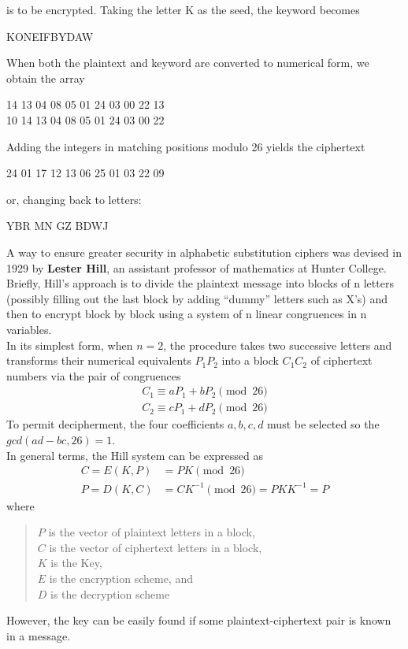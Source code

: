 \documentclass{article}
\begin{document}
is to be encrypted. Taking the letter K as the seed, the keyword becomes
\begin{center}
    KONEIFBYDAW
\end{center}
When both the plaintext and keyword are converted to numerical form, we obtain the array
\begin{center}
    14 13 04 08 05 01 24 03 00 22 13\\
    10 14 13 04 08 05 01 24 03 00 22
\end{center}
Adding the integers in matching positions modulo 26 yields the ciphertext
\begin{center}
    24 01 17 12 13 06 25 01 03 22 09
\end{center}
or, changing back to letters:
\begin{center}
    YBR MN GZ BDWJ
\end{center}

A way to ensure greater security in alphabetic substitution ciphers was devised in 1929 by {\bf Lester Hill}, an assistant professor of mathematics at Hunter College. Briefly, Hill's approach is to divide the plaintext message into blocks of n letters (possibly filling out the last block by adding “dummy” letters such as X's) and then to encrypt block by block using a system of n linear congruences in n variables.\\
In its simplest form, when $n = 2$, the procedure takes two successive letters and
transforms their numerical equivalents $P_1P_2$ into a block $C_1C_2$ of ciphertext
numbers via the pair of congruences
\begin{align*}
    C_1 \equiv aP_1 + bP_2 \pmod {26} \\
    C_2 \equiv cP_1 + dP_2 \pmod {26}
\end{align*}
To permit decipherment, the four coefficients $a, b, c, d$ must be selected so the $gcd(ad - bc, 26) = 1$.\\
In general terms, the Hill system can be expressed as
\begin{align*}
    C = E(K, P) &= PK \pmod {26}\\
    P = D(K, C) &= CK^{-1} \pmod {26} = PKK^{-1} = P
\end{align*}
where 
\begin{quote}
    $P$ is the vector of plaintext letters in a block,\\
    $C$ is the vector of ciphertext letters in a block,\\
    $K$ is the Key,\\
    $E$ is the encryption scheme, and\\
    $D$ is the decryption scheme
\end{quote}
However, the key can be easily found if some plaintext-ciphertext pair is known in a message.
\end{document}
